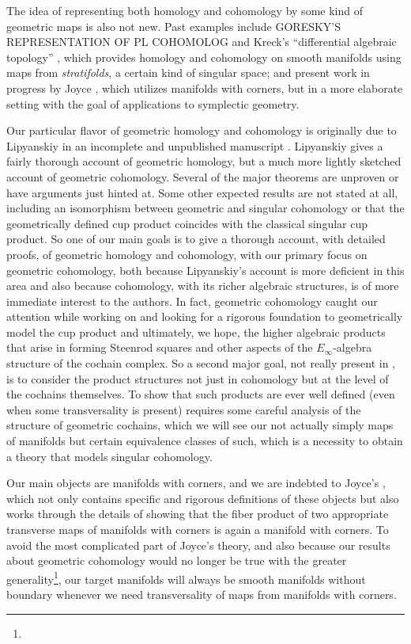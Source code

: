 The idea of representing both homology and cohomology by some kind of geometric maps is also not new. Past examples include GORESKY'S REPRESENTATION OF PL COHOMOLOG and Kreck's ``differential algebraic topology'' \cite{Krec10}, which provides homology and cohomology on smooth manifolds using maps from \textit{stratifolds}, a certain kind of singular space; and present work in progress by Joyce \cite{Joyc15}, which utilizes manifolds with corners, but in a more elaborate setting with the goal of applications to symplectic geometry.

Our particular flavor of geometric homology and cohomology is originally due to Lipyanskiy in an incomplete and unpublished manuscript \cite{Lipy14}. Lipyanskiy gives a fairly thorough account of geometric homology, but a much more lightly sketched account of geometric cohomology. Several of the major theorems are unproven or have arguments just hinted at. Some other expected results are not stated at all, including an isomorphism between geometric and singular cohomology or that the geometrically defined cup product coincides with the classical singular cup product. So one of our main goals is to give a thorough account, with detailed proofs, of geometric homology and cohomology, with our primary focus on geometric cohomology, both because Lipyanskiy's account is more deficient in this area and also because cohomology, with its richer algebraic structures, is of more immediate interest to the authors. In fact, geometric cohomology caught our attention while working on \cite{FMS-flows} and looking for a rigorous foundation to geometrically model the cup product and ultimately, we hope, the higher algebraic products that arise in forming Steenrod squares and other aspects of the $E_\infty$-algebra structure of the cochain complex. So a second major goal, not really present in \cite{Lipy14}, is to consider the product structures not just in cohomology but at the level of the cochains themselves. To show that such products are ever well defined (even when some transversality is present) requires some careful analysis of the structure of geometric cochains, which we will see our not actually simply maps of manifolds but certain equivalence classes of such, which is a necessity to obtain a theory that models singular cohomology.

Our main objects are manifolds with corners, and we are indebted to Joyce's \cite{Joy12}, which not only contains specific and rigorous definitions of these objects but also works through the details of showing that the fiber product of two appropriate transverse maps of manifolds with corners is again a manifold with corners. To avoid the most complicated part of Joyce's theory, and also because our results about geometric cohomology would no longer be true with the greater generality\footnote{}, our target manifolds will always be smooth manifolds without boundary whenever we need transversality of maps from manifolds with corners.

